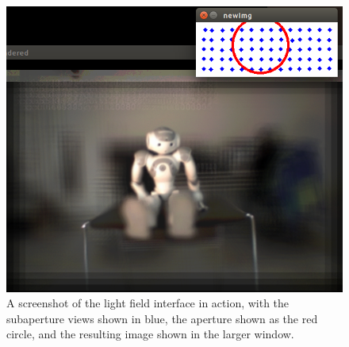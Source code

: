 \documentclass[12pt]{report}
\begin{document}
\begin{figure}[!ht]
	\centering
	\includegraphics[scale=0.4]{nau_lf.png}
	\caption{A screenshot of the light field interface in action, with the subaperture views shown in blue, the aperture shown as the red circle, and the resulting image shown in the larger window.}
	\label{fig:light_field_system}
\end{figure}
\end{document}
